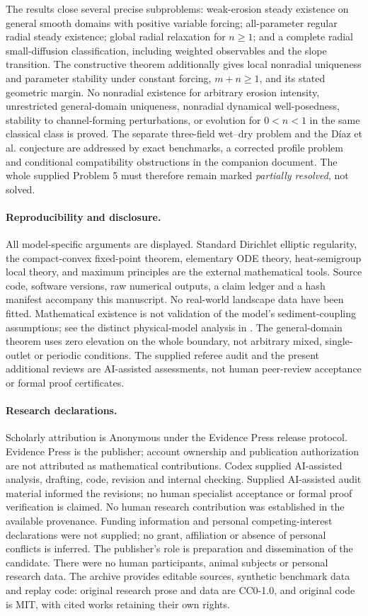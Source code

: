 \documentclass[11pt,a4paper]{article}
\theoremstyle{definition}\newtheorem{definition}[theorem]{Definition}
\theoremstyle{remark}\newtheorem{remark}[theorem]{Remark}
\begin{document}
The results close several precise subproblems: weak-erosion steady existence on general smooth domains with positive variable forcing; all-parameter regular radial steady existence; global radial relaxation for $n\geq1$; and a complete radial small-diffusion classification, including weighted observables and the slope transition. The constructive theorem additionally gives local nonradial uniqueness and parameter stability under constant forcing, $m+n\geq1$, and its stated geometric margin. No nonradial existence for arbitrary erosion intensity, unrestricted general-domain uniqueness, nonradial dynamical well-posedness, stability to channel-forming perturbations, or evolution for $0<n<1$ in the same classical class is proved. The separate three-field wet--dry problem and the D\'iaz et al. conjecture are addressed by exact benchmarks, a corrected profile problem and conditional compatibility obstructions in the companion document. The whole supplied Problem 5 must therefore remain marked \emph{partially resolved}, not solved.

\paragraph{Reproducibility and disclosure.}
All model-specific arguments are displayed. Standard Dirichlet elliptic regularity, the compact-convex fixed-point theorem, elementary ODE theory, heat-semigroup local theory, and maximum principles are the external mathematical tools. Source code, software versions, raw numerical outputs, a claim ledger and a hash manifest accompany this manuscript. No real-world landscape data have been fitted. Mathematical existence is not validation of the model's sediment-coupling assumptions; see the distinct physical-model analysis in \cite{Litwin2025}. The general-domain theorem uses zero elevation on the whole boundary, not arbitrary mixed, single-outlet or periodic conditions. The supplied referee audit and the present additional reviews are AI-assisted assessments, not human peer-review acceptance or formal proof certificates.

\paragraph{Research declarations.}
Scholarly attribution is Anonymous under the Evidence Press release protocol.
Evidence Press is the publisher; account ownership and publication authorization
are not attributed as mathematical contributions. Codex supplied AI-assisted
analysis, drafting, code, revision and internal checking. Supplied AI-assisted
audit material informed the revisions; no human specialist acceptance or
formal proof verification is claimed. No human research contribution was
established in the available provenance. Funding information and personal
competing-interest declarations were not supplied; no grant, affiliation or
absence of personal conflicts is inferred. The publisher's role is preparation
and dissemination of the candidate. There were no human participants, animal
subjects or personal research data. The archive provides editable sources,
synthetic benchmark data and replay code: original research prose and data are
CC0-1.0, and original code is MIT, with cited works retaining their own rights.
\end{document}
